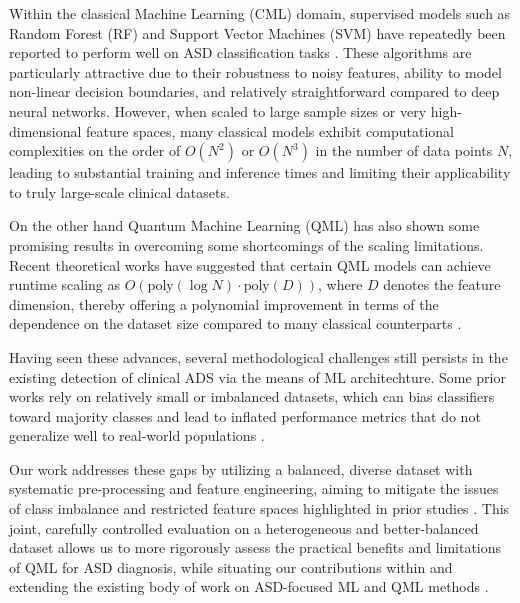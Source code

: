 \documentclass[runningheads]{llncs}
\begin{document}
Within the classical Machine Learning (CML) domain, supervised models such as Random Forest (RF) and Support Vector Machines (SVM) have repeatedly been reported to perform well on ASD classification tasks \cite{vakadkar2021}. These algorithms are particularly attractive due to their robustness to noisy features, ability to model non-linear decision boundaries, and relatively straightforward compared to deep neural networks. However, when scaled to large sample sizes or very high-dimensional feature spaces, many classical models exhibit computational complexities on the order of $O(N^2)$ or $O(N^3)$ in the number of data points $N$, leading to substantial training and inference times and limiting their applicability to truly large-scale clinical datasets.

On the other hand Quantum Machine Learning (QML) has also shown some promising results in overcoming some shortcomings of the scaling limitations. Recent theoretical works have suggested that certain QML models can achieve runtime scaling as $O(\text{poly}(\log N) \cdot \text{poly}(D))$, where $D$ denotes the feature dimension, thereby offering a polynomial improvement in terms of the dependence on the dataset size compared to many classical counterparts \cite{saranya2025}. 

Having seen these advances, several methodological challenges still persists in the existing detection of clinical ADS via the means of ML architechture. Some prior works rely on relatively small or imbalanced datasets, which can bias classifiers toward majority classes and lead to inflated performance metrics that do not generalize well to real-world populations \cite{lee2020}.

Our work addresses these gaps by utilizing a balanced, diverse dataset with systematic pre-processing and feature engineering, aiming to mitigate the issues of class imbalance and restricted feature spaces highlighted in prior studies \cite{lee2020}. This joint, carefully controlled evaluation on a heterogeneous and better-balanced dataset allows us to more rigorously assess the practical benefits and limitations of QML for ASD diagnosis, while situating our contributions within and extending the existing body of work on ASD-focused ML and QML methods \cite{vakadkar2021,saranya2025,lee2020,nogay2020}.

\end{document}
